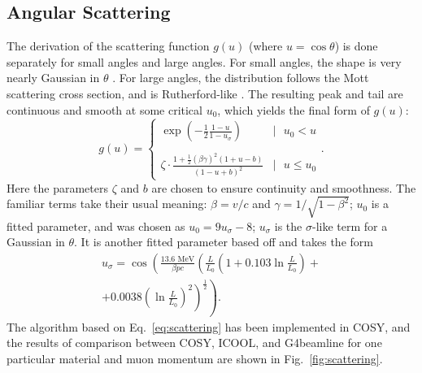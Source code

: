 \documentclass{jacow}
\begin{document}
\subsection{Angular Scattering}
The derivation of the scattering function $g(u)$ (where  $u = \cos\theta$) is done separately for small angles and large angles. For small angles, the shape is very nearly Gaussian in $\theta$ \cite{GS}. For large angles, the distribution follows the Mott scattering cross section, and is Rutherford-like \cite{Mott}. The resulting peak and tail are continuous and smooth at some critical $u_0$, which yields the final form of $g(u)$:
\begin{equation}
  g(u) = \left\{
  \begin{array}{lr}
    \displaystyle{\exp\left(-\frac{1}{2}\frac{1-u}{1-u_\sigma}\right)} & |\text{ } u_0 < u\\
    \displaystyle{} \\
    \displaystyle{\zeta\cdot\frac{1+\frac{1}{2}(\beta\gamma)^2(1+u-b)}{(1-u+b)^2}} & | \text{ } u \le u_0
  \end{array}.
\right.
\label{eq:scattering}
\end{equation}
Here the parameters $\zeta$ and $b$ are chosen to ensure continuity and smoothness. The familiar terms take their usual meaning: $\beta=v/c$ and $\gamma=1/\sqrt{1-\beta^2}$; $u_0$ is a fitted parameter, and was chosen as $u_0=9u_\sigma-8$; $u_\sigma$ is the $\sigma$-like term for a Gaussian in $\theta$. It is another fitted parameter based off \cite{highland} and takes the form
\begin{multline*}
u_\sigma=\cos\left(\frac{13.6 \text{ MeV}}{\beta pc}\left(\frac{L}{L_0}\left(1+0.103\ln\frac{L}{L_0}\right)+\right.\right.\\
\left.\left.+0.0038\left(\ln\frac{L}{L_0}\right)^2\right)^\frac{1}{2}\right).
\end{multline*}
The algorithm based on Eq.~\eqref{eq:scattering} has been implemented in COSY, and the results of comparison between COSY, ICOOL, and G4beamline for one particular material and muon momentum are shown in Fig.~\ref{fig:scattering}.
\end{document}
